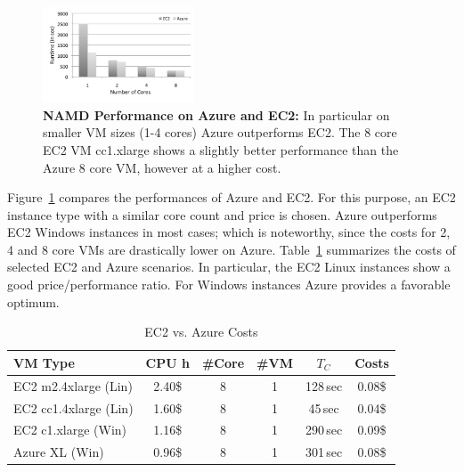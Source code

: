 \documentclass[conference,final]{IEEEtran}
\newcommand{\up}{\vspace*{-1em}}
\newcommand{\tc}{$T_{C}$ }
\begin{document}
\begin{figure}[t]
    \centering
        \includegraphics[width=0.4\textwidth]{performance/namd_ec2_azure.pdf}
        \up
        \caption{\textbf{NAMD Performance on Azure and EC2:} In
          particular on smaller VM sizes (1-4 cores) Azure outperforms
          EC2. The 8 core EC2 VM cc1.xlarge shows a slightly better
          performance than the Azure 8 core VM, however at a higher
          cost.} %
    \label{fig:performance_namd_ec2_azure}
\end{figure}

Figure~\ref{fig:performance_namd_ec2_azure} compares the performances
of Azure and EC2. For this purpose, an EC2 instance type with a similar core
count and price is chosen. Azure outperforms EC2 Windows instances in 
most cases; which is noteworthy, since the costs for 2, 4 and 8 core VMs are
drastically lower on Azure. Table~\ref{tbl:costs} summarizes the
costs of selected EC2 and Azure scenarios. In particular, the EC2
Linux instances show a good price/performance ratio. For Windows
instances Azure provides a favorable optimum.



\begin{table}[ht]
    \centering
	\begin{scriptsize}
		\begin{tabular}{|l|c|c|c|c|c|}
	        \hline
	        VM Type                 &CPU h  &\#Core &\#VM &\tc &Costs  \\ \hline
	        EC2 m2.4xlarge (Lin)  &2.40\$  &8          &1      &128\,sec     &0.08\$ \\ \hline
	        EC2 cc1.4xlarge (Lin) &1.60\$  &8          &1      &45\,sec     &0.04\$ \\ \hline
	        EC2 c1.xlarge   (Win)   &1.16\$  &8          &1      &290\,sec    &0.09\$ \\ \hline
	        Azure XL (Win)  &0.96\$ &8          &1      &301\,sec    &0.08\$ \\ \hline
		\end{tabular}
	\end{scriptsize}
	\caption{EC2 vs. Azure Costs\label{tbl:costs}}
	\up
\end{table}
\end{document}

